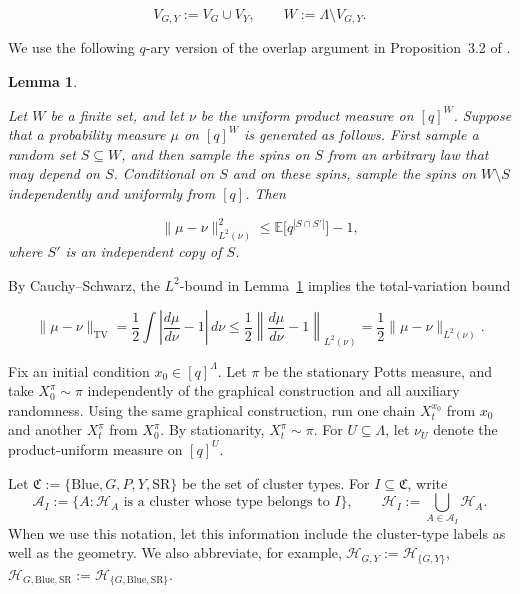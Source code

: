 \documentclass[letterpaper,11pt,reqno]{amsart}
\newtheorem{lemma}[thm]{Lemma}
\theoremstyle{definition}
\newcommand{\TV}{\mathrm{TV}}
\begin{document}
\[
V_{G,Y}:=V_G\cup V_Y,
\qquad
W:=\Lambda\setminus V_{G,Y}.
\]


We use the following \(q\)-ary version of the overlap argument in Proposition~3.2 of \cite{MillerPeres}.

\begin{lemma}\label{lem:MP-overlap}

Let \(W\) be a finite set, and let \(\nu\) be the uniform product measure on
\([q]^W\). Suppose that a probability measure \(\mu\) on \([q]^W\) is
generated as follows. First sample a random set \(S\subseteq W\), and then
sample the spins on \(S\) from an arbitrary law that may depend on \(S\).
Conditional on \(S\) and on these spins, sample the spins on \(W\setminus S\)
independently and uniformly from \([q]\). Then


\[
\|\mu-\nu\|_{L^2(\nu)}^2
\le
\mathbb E\big[q^{|S\cap S'|}\big]-1,
\]
where \(S'\) is an independent copy of \(S\).
\end{lemma}

By Cauchy--Schwarz, the \(L^2\)-bound in Lemma~\ref{lem:MP-overlap}
implies the total-variation bound


\[
\|\mu-\nu\|_{\TV}
=
\frac12\int \left|\frac{d\mu}{d\nu}-1\right|\,d\nu
\le
\frac12
\left\|
\frac{d\mu}{d\nu}-1
\right\|_{L^2(\nu)}=
\frac12\|\mu-\nu\|_{L^2(\nu)}.
\]


Fix an initial condition \(x_0\in[q]^\Lambda\). Let \(\pi\) be the stationary
Potts measure, and take \(X_0^\pi\sim\pi\) independently of the graphical
construction and all auxiliary randomness. Using the same graphical
construction, run one chain \(X_t^{x_0}\) from \(x_0\) and another
\(X_t^\pi\) from \(X_0^\pi\). By stationarity, \(X_t^\pi\sim\pi\). For
\(U\subseteq\Lambda\), let \(\nu_U\) denote the product-uniform measure on
\([q]^U\).


Let $\mathfrak C:=\{\mathrm{Blue},G,P,Y,\mathrm{SR}\}$
be the set of cluster types. For \(I\subseteq\mathfrak C\), write
\[
\mathscr A_I
:=
\{A:\mathcal H_A\text{ is a cluster whose type belongs to }I\},
\qquad
\mathcal H_I
:=
\bigcup_{A\in\mathscr A_I}\mathcal H_A .
\]
When we use this notation, let this information include the cluster-type labels as well as the geometry.
We also abbreviate, for example, $\mathcal H_{G,Y}:=\mathcal H_{\{G,Y\}}$, $\mathcal H_{G,\mathrm{Blue},\mathrm{SR}}
:=\mathcal H_{\{G,\mathrm{Blue},\mathrm{SR}\}}$. 
\end{document}
